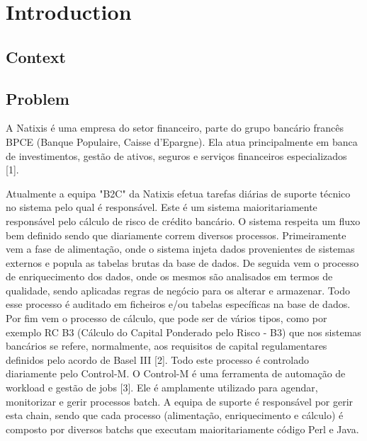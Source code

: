 % 
\chapter{Introduction} %
\label{chap:Chapter1} %


%
\section{Context} 


\section{Problem}

A Natixis é uma empresa do setor financeiro, parte do grupo bancário francês BPCE (Banque Populaire,
 Caisse d'Epargne). Ela atua principalmente em banca de investimentos, gestão de ativos, seguros e serviços
 financeiros especializados [1].

 Atualmente a equipa "B2C" da Natixis efetua tarefas diárias de suporte técnico no sistema pelo qual é
 responsável. Este é um sistema maioritariamente responsável pelo cálculo de risco de crédito bancário. O
 sistema respeita um fluxo bem definido sendo que diariamente correm diversos processos. Primeiramente
 vem a fase de alimentação, onde o sistema injeta dados provenientes de sistemas externos e popula as
 tabelas brutas da base de dados. De seguida vem o processo de enriquecimento dos dados, onde os
 mesmos são analisados em termos de qualidade, sendo aplicadas regras de negócio para os alterar e
 armazenar. Todo esse processo é auditado em ficheiros e/ou tabelas específicas na base de dados. Por fim
 vem o processo de cálculo, que pode ser de vários tipos, como por exemplo RC B3 (Cálculo do Capital
 Ponderado pelo Risco - B3) que nos sistemas bancários se refere, normalmente, aos requisitos de capital
 regulamentares definidos pelo acordo de Basel III [2].
 Todo este processo é controlado diariamente pelo Control-M. O Control-M é uma ferramenta de automação
 de workload e gestão de jobs [3]. Ele é amplamente utilizado para agendar, monitorizar e gerir processos
 batch. A equipa de suporte é responsável por gerir esta chain, sendo que cada processo (alimentação,
 enriquecimento e cálculo) é composto por diversos batchs que executam maioritariamente código Perl e
 Java.

